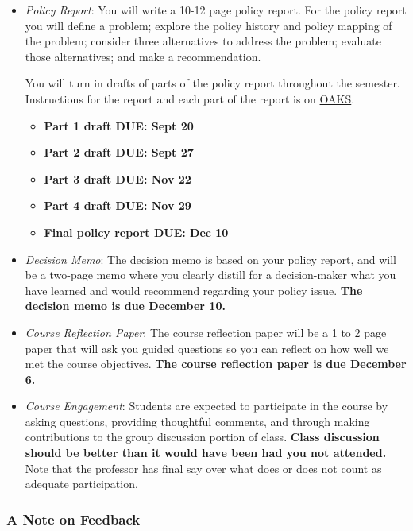 \begin{itemize}
\item
  \emph{Policy Report}: You will write a 10-12 page policy report. For
  the policy report you will define a problem; explore the policy
  history and policy mapping of the problem; consider three alternatives
  to address the problem; evaluate those alternatives; and make a
  recommendation.

  \vspace{0.10in} \noindent You will turn in drafts of parts of the
  policy report throughout the semester. Instructions for the report and
  each part of the report is on \href{https://lms.cofc.edu}{OAKS}.

  \begin{itemize}
  
  \item
    \textbf{Part 1 draft DUE: Sept 20}
  \item
    \textbf{Part 2 draft DUE: Sept 27}
  \item
    \textbf{Part 3 draft DUE: Nov 22}
  \item
    \textbf{Part 4 draft DUE: Nov 29}
  \item
    \textbf{Final policy report DUE: Dec 10}
  \end{itemize}
\item
  \emph{Decision Memo}: The decision memo is based on your policy
  report, and will be a two-page memo where you clearly distill for a
  decision-maker what you have learned and would recommend regarding
  your policy issue. \textbf{The decision memo is due December 10.}
\item
  \emph{Course Reflection Paper}: The course reflection paper will be a
  1 to 2 page paper that will ask you guided questions so you can
  reflect on how well we met the course objectives. \textbf{The course
  reflection paper is due December 6.}
\item
  \emph{Course Engagement}: Students are expected to participate in the
  course by asking questions, providing thoughtful comments, and through
  making contributions to the group discussion portion of class.
  \textbf{Class discussion should be better than it would have been had
  you not attended.} Note that the professor has final say over what
  does or does not count as adequate participation.
\end{itemize}

\hypertarget{a-note-on-feedback}{%
\subsubsection{A Note on Feedback}\label{a-note-on-feedback}}

